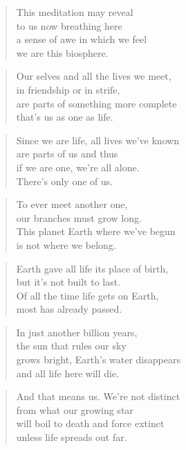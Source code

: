 \documentclass[10pt,a4paper]{article}
\begin{document}
\begin{multicols}{2}
\begin{verse}
This meditation may reveal\\
to us now breathing here\\
a sense of awe in which we feel\\
we are this biosphere.
\end{verse}

\begin{verse}
Our selves and all the lives we meet,\\
in friendship or in strife,\\
are parts of something more complete\\
that’s us as one as life.
\end{verse}

\begin{verse}
Since we are life, all lives we’ve known\\
are parts of us and thus\\
if we are one, we’re all alone.\\
There’s only one of us.
\end{verse}

\begin{verse}
To ever meet another one,\\
our branches must grow long.\\
This planet Earth where we’ve begun\\
is not where we belong.
\end{verse}

\begin{verse}
Earth gave all life its place of birth,\\
but it’s not built to last.\\
Of all the time life gets on Earth,\\
most has already passed.
\end{verse}

\begin{verse}
In just another billion years,\\
the sun that rules our sky\\
grows bright, Earth’s water disappears\\
and all life here will die.
\end{verse}

\begin{verse}
And that means us. We’re not distinct\\
from what our growing star\\
will boil to death and force extinct\\
unless life spreads out far.
\end{verse}


\end{multicols}
\end{document}
